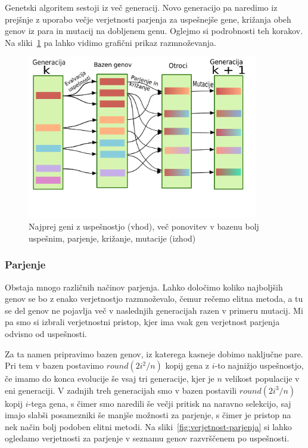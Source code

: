 Genetski algoritem sestoji iz več generacij. Novo generacijo pa naredimo iz prejšnje z uporabo večje verjetnosti parjenja za uspešnejše gene, križanja obeh genov iz para in mutacij na dobljenem genu. Oglejmo si podrobnosti teh korakov. Na sliki~\ref{fig:genetski} pa lahko vidimo grafični prikaz razmnoževanja.

\begin{figure}[ht]  %
	\centering
	\includegraphics[width=0.9\textwidth]{../poglavja/images/genetski.pdf}
	\caption[Razmnoževanje uspešnejših genov]{Najprej geni z uspešnostjo (vhod), več ponovitev v bazenu bolj uspešnim, parjenje, križanje, mutacije (izhod)} %
	\label{fig:genetski}
\end{figure}

\subsubsection{Parjenje} \label{parjenje}

Obstaja mnogo različnih načinov parjenja. Lahko določimo koliko najboljših genov se bo z enako verjetnostjo razmnoževalo, čemur rečemo elitna metoda, a tu se del genov ne pojavlja več v naslednjih generacijah razen v primeru mutacij. Mi pa smo si izbrali verjetnostni pristop, kjer ima vsak gen verjetnost parjenja odvisno od uspešnosti.

Za ta namen pripravimo bazen genov, iz katerega kasneje dobimo naključne pare. Pri tem v bazen postavimo $round(2 i^2 / n)$ kopij gena z $i$-to najnižjo uspešnostjo, če imamo do konca evolucije še vsaj tri generacije, kjer je $n$ velikost populacije v eni generaciji. V zadnjih treh generacijah smo v bazen postavili $round(2 i^3 / n)$ kopij $i$-tega gena, s čimer smo naredili še večji pritisk na naravno selekcijo, saj imajo slabši posamezniki še manjše možnosti za parjenje, s čimer je pristop na nek način bolj podoben elitni metodi. Na sliki~\ref{fig:verjetnost-parjenja} si lahko ogledamo verjetnosti za parjenje v seznamu genov razvrščenem po uspešnosti.

